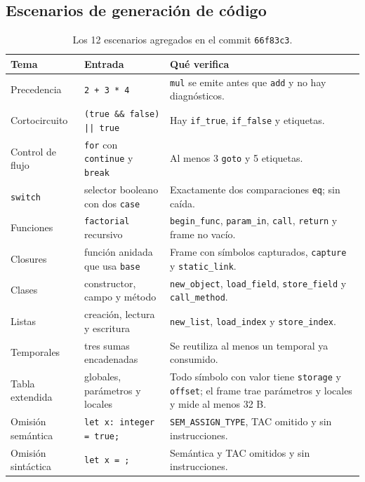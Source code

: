 \documentclass[11pt,a4paper]{article}
\begin{document}
\subsection{Escenarios de generación de código}

\begin{table}[H]
\centering
\small
\begin{tabular}{@{}L{3.4cm}L{3.4cm}L{7.4cm}@{}}
\toprule
\textbf{Tema} & \textbf{Entrada} & \textbf{Qué verifica} \\
\midrule
Precedencia & \texttt{2 + 3 * 4} & \texttt{mul} se emite antes que \texttt{add}
y no hay diagnósticos. \\
Cortocircuito & \texttt{(true \&\& false) || true} & Hay \texttt{if\_true},
\texttt{if\_false} y etiquetas. \\
Control de flujo & \texttt{for} con \texttt{continue} y \texttt{break} & Al
menos 3 \texttt{goto} y 5 etiquetas. \\
\texttt{switch} & selector booleano con dos \texttt{case} & Exactamente dos
comparaciones \texttt{eq}; sin caída. \\
Funciones & \texttt{factorial} recursivo & \texttt{begin\_func},
\texttt{param\_in}, \texttt{call}, \texttt{return} y frame no vacío. \\
Closures & función anidada que usa \texttt{base} & Frame con símbolos
capturados, \texttt{capture} y \texttt{static\_link}. \\
Clases & constructor, campo y método & \texttt{new\_object},
\texttt{load\_field}, \texttt{store\_field} y \texttt{call\_method}. \\
Listas & creación, lectura y escritura & \texttt{new\_list},
\texttt{load\_index} y \texttt{store\_index}. \\
Temporales & tres sumas encadenadas & Se reutiliza al menos un temporal ya
consumido. \\
Tabla extendida & globales, parámetros y locales & Todo símbolo con valor tiene
\texttt{storage} y \texttt{offset}; el frame trae parámetros y locales y mide
al menos 32 B. \\
Omisión semántica & \texttt{let x: integer = true;} & \texttt{SEM\_ASSIGN\_TYPE},
TAC omitido y sin instrucciones. \\
Omisión sintáctica & \texttt{let x = ;} & Semántica y TAC omitidos y sin
instrucciones. \\
\bottomrule
\end{tabular}
\caption{Los 12 escenarios agregados en el commit \texttt{66f83c3}.}
\end{table}
\end{document}
